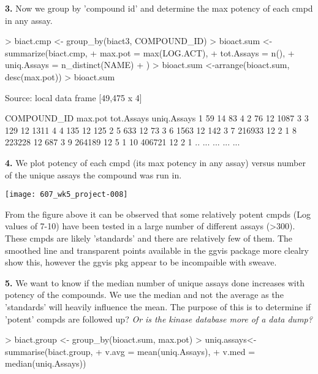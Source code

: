 \documentclass{article}
\begin{document}
\textbf{3.}  Now we group by 'compound id'  and determine the max potency of each cmpd in any assay.

\begin{Schunk}
\begin{Sinput}
> biact.cmp <- group_by(biact3, COMPOUND_ID)
> bioact.sum <- summarize(biact.cmp,
+                         max.pot = max(LOG.ACT),
+                         tot.Assays = n(),
+                         uniq.Assays = n_distinct(NAME)
+                         )
> bioact.sum <-arrange(bioact.sum, desc(max.pot))
> bioact.sum
\end{Sinput}
\begin{Soutput}
Source: local data frame [49,475 x 4]

   COMPOUND_ID max.pot tot.Assays uniq.Assays
1           59      14         83           4
2           76      12       1087           3
3          129      12       1311           4
4          135      12        125           2
5          633      12         73           3
6         1563      12        142           3
7       216933      12          2           1
8       223228      12        687           3
9       264189      12          5           1
10      406721      12          2           1
..         ...     ...        ...         ...
\end{Soutput}
\end{Schunk}

\textbf{4.}  We plot potency of each cmpd (its max potency in any assay) versus number of the unique assays the compound was run in. 

\texttt{[image: 607\_wk5\_project-008]}

From the figure above it can be observed that some relatively potent cmpds (Log values of 7-10) have been tested in a large number of different assays (>300).  These cmpds are likely 'standards' and there are relatively few of them.  The smoothed line and transparent points available in the ggvis package more clealry show this, however the ggvis pkg appear to be incompaible with sweave.

\textbf{5.}  We want to know if the median number of unique assays done increases with potency of the compounds.  We use the median and not the average as the 'standards' will heavily influence the mean. The purpose of this is to determine if 'potent' compds are followed up?  \emph{Or is the kinase database more of a data dump? } 

\begin{Schunk}
\begin{Sinput}
> biact.group <- group_by(bioact.sum, max.pot)
> uniq.assays<- summarise(biact.group,
+                           v.avg = mean(uniq.Assays),
+                           v.med = median(uniq.Assays))
\end{Sinput}
\end{Schunk}
\end{document}
